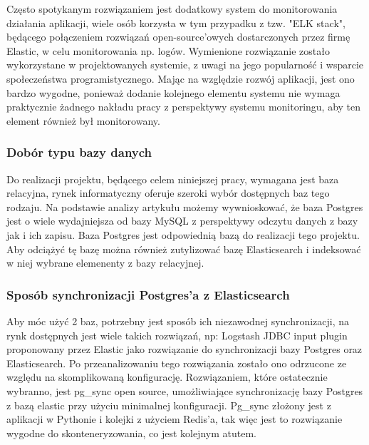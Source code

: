Często spotykanym rozwiązaniem jest dodatkowy system do monitorowania działania aplikacji, wiele osób korzysta w tym przypadku  z tzw. "ELK stack", będącego połączeniem rozwiązań open-source'owych dostarczonych przez firmę Elastic, w celu monitorowania np. logów. Wymienione rozwiązanie zostało wykorzystane  w projektowanych systemie, z uwagi  na jego popularność i wsparcie społeczeństwa programistycznego. Mając na względzie rozwój aplikacji, jest ono bardzo wygodne, ponieważ dodanie kolejnego elementu systemu nie wymaga praktycznie żadnego nakładu pracy z perspektywy systemu monitoringu, aby ten element również był monitorowany.
\subsubsection{Dobór typu bazy danych}
Do realizacji projektu, będącego celem niniejszej pracy,  wymagana jest baza relacyjna, rynek informatyczny oferuje szeroki wybór dostępnych baz tego rodzaju. Na podstawie analizy artykułu \cite{fi16100382} możemy wywnioskować, że baza Postgres jest o wiele wydajniejsza od bazy MySQL z perspektywy odczytu danych z bazy jak i ich zapisu. Baza Postgres jest odpowiednią bazą do realizacji tego projektu. Aby odciążyć tę bazę można również zutylizować bazę Elasticsearch i indeksować w niej wybrane elemenenty z bazy relacyjnej.
\subsubsection{Sposób synchronizacji Postgres'a z Elasticsearch}
Aby móc użyć 2 baz,  potrzebny jest sposób ich niezawodnej synchronizacji, na rynk dostępnych jest wiele takich  rozwiązań, np: Logstash JDBC input plugin proponowany przez Elastic jako rozwiązanie do synchronizacji bazy Postgres oraz Elasticsearch. Po przeanalizowaniu tego rozwiązania zostało ono odrzucone ze względu na skomplikowaną konfigurację. Rozwiązaniem, które ostatecznie wybranno,  jest pg\_sync open source,  umożliwiające synchronizację bazy Postgres z bazą elastic przy użyciu minimalnej konfiguracji. Pg\_sync złożony jest z aplikacji w Pythonie i kolejki z użyciem Redis'a, tak więc jest to rozwiązanie wygodne do skonteneryzowania, co jest kolejnym atutem.
